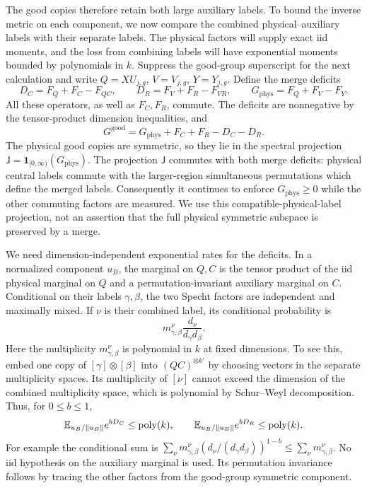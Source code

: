 The good copies therefore retain both large auxiliary labels.  To bound
the inverse metric on each component, we now compare the combined
physical--auxiliary labels with their separate labels.  The physical
factors will supply exact iid moments, and the loss from combining
labels will have exponential moments bounded by polynomials in $k$.
Suppress the good-group superscript for the next calculation and write
$Q=XU_{j,g}$, $V=V_{j,g}$, $Y=Y_{j,g}$.  Define the merge deficits
\[
 D_C=F_Q+F_C-F_{QC},\qquad
 D_R=F_V+F_R-F_{VR},\qquad
 G_{\mathrm{phys}}=F_Q+F_V-F_Y.
\]
All these operators, as well as $F_C,F_R$, commute.  The deficits are
nonnegative by the tensor-product dimension inequalities, and
\begin{equation}
 G^{\mathrm{good}}
       =G_{\mathrm{phys}}+F_C+F_R-D_C-D_R.
 \label{comparator:merge-decomposition}
\end{equation}
The physical good copies are symmetric, so they lie in the spectral
projection
$\mathsf J=\mathbf1_{[0,\infty)}(G_{\mathrm{phys}})$.
The projection $\mathsf J$ commutes with both merge deficits: physical
central labels commute with the larger-region simultaneous permutations
which define the merged labels.  Consequently it continues to enforce
$G_{\mathrm{phys}}\ge0$ while the other commuting factors are measured.
We use this compatible-physical-label projection, not an assertion that
the full physical symmetric subspace is preserved by a merge.

We need dimension-independent exponential rates for the deficits.
In a normalized component $u_B$, the marginal on $Q,C$ is the tensor
product of the iid physical marginal on $Q$ and a permutation-invariant
auxiliary marginal on $C$.  Conditional on their labels $\gamma,\beta$,
the two Specht factors are independent and maximally mixed.
If $\nu$ is their combined label, its conditional probability is
\[
       m_{\gamma,\beta}^{\nu}
             \frac{d_\nu}{d_\gamma d_\beta}.
\]
Here the multiplicity $m_{\gamma,\beta}^{\nu}$ is polynomial in $k$ at
fixed dimensions.  To see this, embed one copy of
$[\gamma]\otimes[\beta]$ into $(QC)^{\otimes k'}$ by choosing vectors
in the separate multiplicity spaces.  Its multiplicity of $[\nu]$
cannot exceed the dimension of the combined multiplicity space, which
is polynomial by Schur--Weyl decomposition.  Thus, for $0\le b\le1$,
\begin{equation}
 \mathbb E_{u_B/\|u_B\|}e^{bD_C}\le\operatorname{poly}(k),
 \qquad
 \mathbb E_{u_B/\|u_B\|}e^{bD_R}\le\operatorname{poly}(k).
 \label{comparator:merge-moments}
\end{equation}
For example the conditional sum is
$\sum_\nu m_{\gamma,\beta}^{\nu}
(d_\nu/(d_\gamma d_\beta))^{1-b}\le\sum_\nu m_{\gamma,\beta}^{\nu}$.
No iid hypothesis on the auxiliary marginal is used.  Its permutation
invariance follows by tracing the other factors from the good-group
symmetric component.

